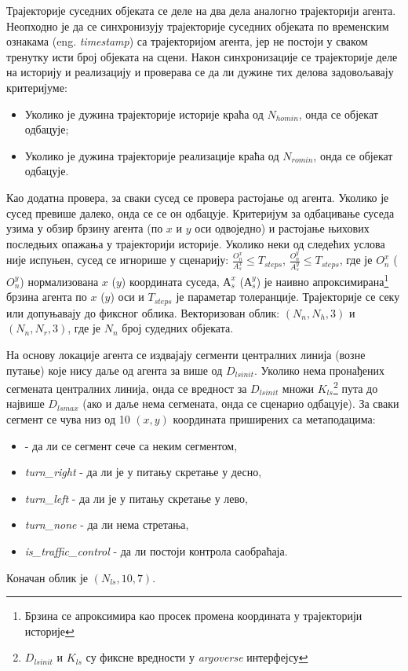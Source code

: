 \documentclass[11pt,oneside]{memoir}
\begin{document}
Трајекторије суседних објеката се деле на два дела аналогно трајекторији агента. Неопходно је да се синхронизују трајекторије 
суседних објеката по временским ознакама (eng. \textit{timestamp}) са трајекторијом агента, јер не постоји у сваком тренутку исти
број објеката на сцени. Након синхронизације се трајекторије деле на историју и реализацију и проверава се да ли дужине тих
делова задовољавају критеријуме:
\begin{itemize}
  \item Уколико је дужина трајекторије историје краћа од $N_{homin}$, онда се објекат одбацује;
  \item Уколико је дужина трајекторије реализације краћа од $N_{romin}$, онда се објекат одбацује.
\end{itemize}
Као додатна провера, за сваки сусед се провера растојање од агента. Уколико је сусед превише далеко, онда се се он одбацује.
Критеријум за одбацивање суседа узима у обзир брзину агента (по $x$ и $y$ оси одвоједно) и растојање њихових последњих опажања
у трајекторији историје. Уколико неки од следећих услова није
испуњен, сусед се игнорише у сценарију: $\frac{O_n^x}{A_s^x} \leq T_{steps}$, $\frac{O_n^y}{A_s^y} \leq T_{steps}$,
где је $O_n^x$ ($O_n^y$) нормализована $x$ ($y$) координата суседа, $А_s^x$ ($А_s^y$) је наивно 
апроксимирана\footnote{Брзина се апроксимира као просек промена координата у трајекторији историје} брзина агента
по $x$ ($y$) оси и $T_{steps}$ је параметар толеранције.
Трајекторије се секу или допуњавају до фиксног облика. Векторизован облик: $(N_n, N_h, 3)$ и $(N_n, N_r, 3)$, где је $N_n$ број
судедних објеката. 

На основу локације агента се издвајају сегменти централних линија (возне путање) које нису даље од агента за више од $D_{lsinit}$. Уколико нема
пронађених сегмената централних линија, онда се вредност за $D_{lsinit}$ множи $K_{ls}$\footnote{$D_{lsinit}$ и $K_{ls}$ су фиксне вредности
у \textit{argoverse} интерфејсу} 
пута до највише $D_{lsmax}$ (ако и даље нема сегмената, 
онда се сценарио одбацује). За сваки сегмент се чува низ од 10 $(x, y)$ координата приширених са метаподацима:
\begin{itemize} 
  \item {} - да ли се сегмент сече са неким сегментом,
  \item \textit{turn\_right} - да ли је у питању скретање у десно, 
  \item \textit{turn\_left} - да ли је у питању скретање у лево, 
  \item \textit{turn\_none} - да ли нема стретања, 
  \item \textit{is\_traffic\_control} - да ли постоји контрола саобраћаја. 
\end{itemize}
Коначан облик је $(N_{ls}, 10, 7)$. 
\end{document}
